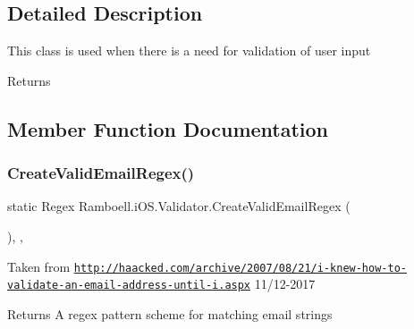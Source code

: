 \subsection{Detailed Description}
This class is used when there is a need for validation of user input 

\begin{DoxyReturn}{Returns}

\end{DoxyReturn}


\subsection{Member Function Documentation}
\mbox{\label{class_ramboell_1_1i_o_s_1_1_validator_a6e258a73cdcd1a90685fc026e7e92ff3}} 
\subsubsection{\texorpdfstring{Create\+Valid\+Email\+Regex()}{CreateValidEmailRegex()}}
{\footnotesize\ttfamily static Regex Ramboell.\+i\+O\+S.\+Validator.\+Create\+Valid\+Email\+Regex (\begin{DoxyParamCaption}{ }\end{DoxyParamCaption})\hspace{0.3cm}{\ttfamily [inline]}, {\ttfamily [static]}, {\ttfamily [private]}}



Taken from \href{http://haacked.com/archive/2007/08/21/i-knew-how-to-validate-an-email-address-until-i.aspx}{\tt http\+://haacked.\+com/archive/2007/08/21/i-\/knew-\/how-\/to-\/validate-\/an-\/email-\/address-\/until-\/i.\+aspx} 11/12-\/2017 

\begin{DoxyReturn}{Returns}
A regex pattern scheme for matching email strings
\end{DoxyReturn}
\mbox{\label{class_ramboell_1_1i_o_s_1_1_validator_a93026ab8f508ce6cb3e8b666b1c4b1ce}} 
